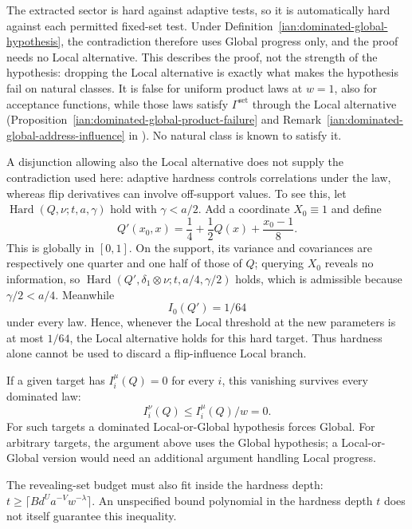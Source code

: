 \begin{remark}
\label{ian:dominated-global-local-distinction}
The extracted sector is hard against adaptive tests, so it is
automatically hard against each permitted fixed-set test. Under
Definition~\ref{ian:dominated-global-hypothesis}, the contradiction
therefore uses Global progress only, and the proof needs no Local
alternative. This describes the proof, not the strength of the
hypothesis: dropping the Local alternative is exactly what makes the
hypothesis fail on natural classes. It is false for uniform product
laws at \(w=1\), also for acceptance functions, while those laws
satisfy \(\Gamma^{\mathrm{set}}\) through the Local alternative
(Proposition~\ref{ian:dominated-global-product-failure} and
Remark~\ref{ian:dominated-global-address-influence} in
). No natural class is known to
satisfy it.

A disjunction allowing also the Local alternative does not supply
the contradiction used here: adaptive hardness controls
correlations under the law, whereas flip derivatives can involve
off-support values. To see this, let
\(\operatorname{Hard}(Q,\nu;t,a,\gamma)\) hold with \(\gamma<a/2\). Add a
coordinate \(X_0\equiv1\) and define
\[
 Q'(x_0,x)=\frac14+\frac12Q(x)+\frac{x_0-1}{8}.
\]
This is globally in \([0,1]\). On the support, its variance and
covariances are respectively one quarter and one half of those of
\(Q\); querying \(X_0\) reveals no information, so
\(\operatorname{Hard}(Q',\delta_1\otimes\nu;t,a/4,\gamma/2)\) holds, which is
admissible because \(\gamma/2<a/4\). Meanwhile
\[
 I_0(Q')=1/64
\]
under every law. Hence, whenever the Local threshold at the new
parameters is at most \(1/64\), the Local alternative holds for this
hard target. Thus hardness alone cannot be used to discard a
flip-influence Local branch.

If a given target has \(I_i^\mu(Q)=0\) for every \(i\), this
vanishing survives every dominated law:
\[
 I_i^\nu(Q)\le I_i^\mu(Q)/w=0.
\]
For such targets a dominated Local-or-Global hypothesis forces
Global. For arbitrary targets, the argument above uses the Global
hypothesis; a Local-or-Global version would need an additional
argument handling Local progress.

The revealing-set budget must also fit inside the hardness depth:
\(t\ge\lceil B d^U a^{-V}w^{-\lambda}\rceil\).
An unspecified bound polynomial in the hardness depth \(t\) does
not itself guarantee this inequality.
\end{remark}

